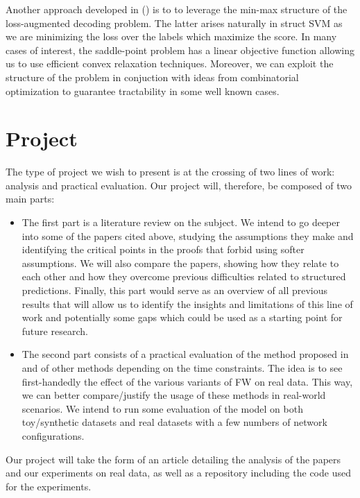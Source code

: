 \documentclass{article}
\begin{document}
Another approach developed in (\cite{dualextraSimon}) is to to leverage the
min-max structure of the loss-augmented decoding problem. The latter arises
naturally in struct SVM as we are minimizing the loss over the labels which
maximize the score. In many cases of interest, the saddle-point problem has a
linear objective function allowing us to use efficient convex relaxation
techniques. Moreover, we can exploit the structure of the problem in conjuction
with ideas from combinatorial optimization to guarantee tractability in some
well known cases.

\section*{Project}
The type of project we wish to present is at the crossing of two lines of work:
analysis and practical evaluation. Our project will, therefore, be composed of
two main parts:
\begin{itemize}
    \item The first part is a literature review on the subject. We intend to go
deeper into some of the papers cited above, studying the assumptions they make
and identifying the critical points in the proofs that forbid using softer
assumptions. We will also compare the papers, showing how they relate to each
other and how they overcome previous difficulties related to structured
predictions. Finally, this part would serve as an overview of all previous
results that will allow us to identify the insights and limitations of this
line of work and potentially some gaps which could be used
as a starting point for future research.
    \item The second part consists of a practical evaluation of the method
proposed in and of other methods depending on the time constraints. The idea is
to see first-handedly the effect of the various variants of FW on real data.
This way, we can better compare/justify the usage of these methods in real-world
scenarios. We intend to run some evaluation of the model on both toy/synthetic
datasets and real datasets with a few numbers of network configurations.
\end{itemize}


Our project will take the form of an article detailing the analysis of the
papers and our experiments on real data, as well as a repository including the
code used for the experiments.

\nocite{*}
\printbibliography
\end{document}
